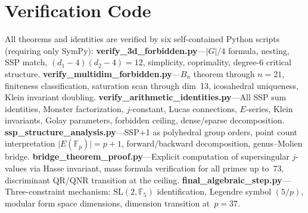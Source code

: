 \documentclass[11pt,letterpaper]{article}
\theoremstyle{definition}
\newcommand{\FF}{\mathbb{F}}
\newcommand{\abs}[1]{\lvert #1 \rvert}
\begin{document}
\section{Verification Code}
All theorems and identities are verified by six self-contained Python scripts (requiring only SymPy):
\textbf{verify\_3d\_forbidden.py}---$\abs{G}/4$ formula, nesting, SSP match, $(d_1{-}4)(d_2{-}4)=12$, simplicity, coprimality, degree-6 critical structure.
\textbf{verify\_multidim\_forbidden.py}---$B_n$ theorem through $n=21$, finiteness classification, saturation scan through dim~13, icosahedral uniqueness, Klein invariant doubling.
\textbf{verify\_arithmetic\_identities.py}---All SSP sum identities, Monster factorization, $j$-constant, Lucas connections, $E$-series, Klein invariants, Golay parameters, forbidden ceiling, dense/sparse decomposition.
\textbf{ssp\_structure\_analysis.py}---SSP+1 as polyhedral group orders, point count interpretation $\abs{E(\FF_p)}=p+1$, forward/backward decomposition, genus--Molien bridge.
\textbf{bridge\_theorem\_proof.py}---Explicit computation of supersingular $j$-values via Hasse invariant, mass formula verification for all primes up to~73, discriminant QR/QNR transition at the ceiling.
\textbf{final\_algebraic\_step.py}---Three-constraint mechanism: $\mathrm{SL}(2,\FF_5)$ identification, Legendre symbol $(5/p)$, modular form space dimensions, dimension transition at~$p=37$.
\end{document}
